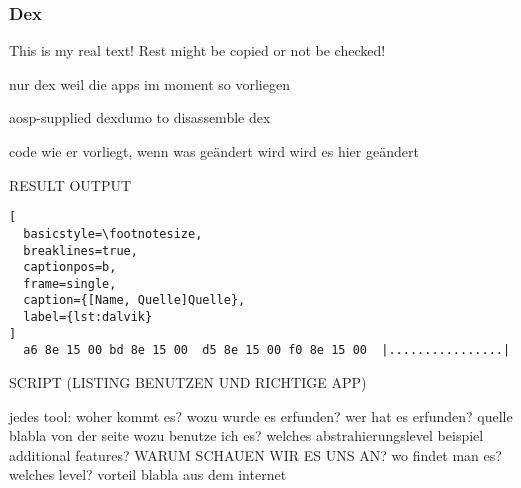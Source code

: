 \subsubsection{Dex} \label{subsubsection:tools-dex}
This is my real text! Rest might be copied or not be checked!


%
nur dex weil die apps im moment so vorliegen

aosp-supplied dexdumo to disassemble dex


\cite{andevconDalvikART}
%




code wie er vorliegt, wenn was geändert wird wird es hier geändert

RESULT OUTPUT

\begin{lstlisting}[
  basicstyle=\footnotesize,
  breaklines=true,
  captionpos=b,
  frame=single,
  caption={[Name, Quelle]Quelle},
  label={lst:dalvik}
]
  a6 8e 15 00 bd 8e 15 00  d5 8e 15 00 f0 8e 15 00  |................|
\end{lstlisting}

SCRIPT (LISTING BENUTZEN UND RICHTIGE APP)



jedes tool:\newline
woher kommt es?\newline
wozu wurde es erfunden?\newline
wer hat es erfunden? quelle\newline
blabla von der seite\newline
wozu benutze ich es?\newline
welches abstrahierungslevel\newline
beispiel\newline
additional features?\newline
WARUM SCHAUEN WIR ES UNS AN?\newline
wo findet man es?\newline
welches level?\newline
vorteil\newline
blabla aus dem internet\newline
